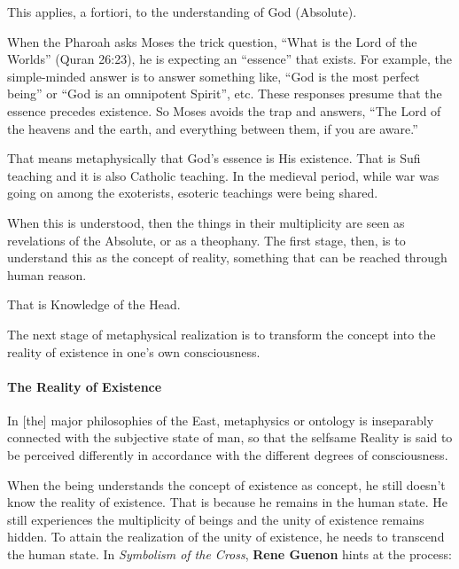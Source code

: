 This applies, a fortiori, to the understanding of God (Absolute). 

\begin{quotex}
When the Pharoah asks Moses the trick question, “What is the Lord of the Worlds” (Quran 26:23), he is expecting an “essence” that exists. For example, the simple-minded answer is to answer something like, “God is the most perfect being” or “God is an omnipotent Spirit”, etc. These responses presume that the essence precedes existence. So Moses avoids the trap and answers, “The Lord of the heavens and the earth, and everything between them, if you are aware.” 
\end{quotex}

That means metaphysically that God's essence is His existence. That is Sufi teaching and it is also Catholic teaching. In the medieval period, while war was going on among the exoterists, esoteric teachings were being shared.

When this is understood, then the things in their multiplicity are seen as revelations of the Absolute, or as a theophany. The first stage, then, is to understand this as the concept of reality, something that can be reached through human reason.

That is Knowledge of the Head.

The next stage of metaphysical realization is to transform the concept into the reality of existence in one's own consciousness.


\paragraph{The Reality of Existence}
\begin{quotex}
In [the] major philosophies of the East, metaphysics or ontology is inseparably connected with the subjective state of man, so that the selfsame Reality is said to be perceived differently in accordance with the different degrees of consciousness. 

\end{quotex}
When the being understands the concept of existence as concept, he still doesn't know the reality of existence. That is because he remains in the human state. He still experiences the multiplicity of beings and the unity of existence remains hidden. To attain the realization of the unity of existence, he needs to transcend the human state. In \emph{Symbolism of the Cross}, \textbf{Rene Guenon} hints at the process:

